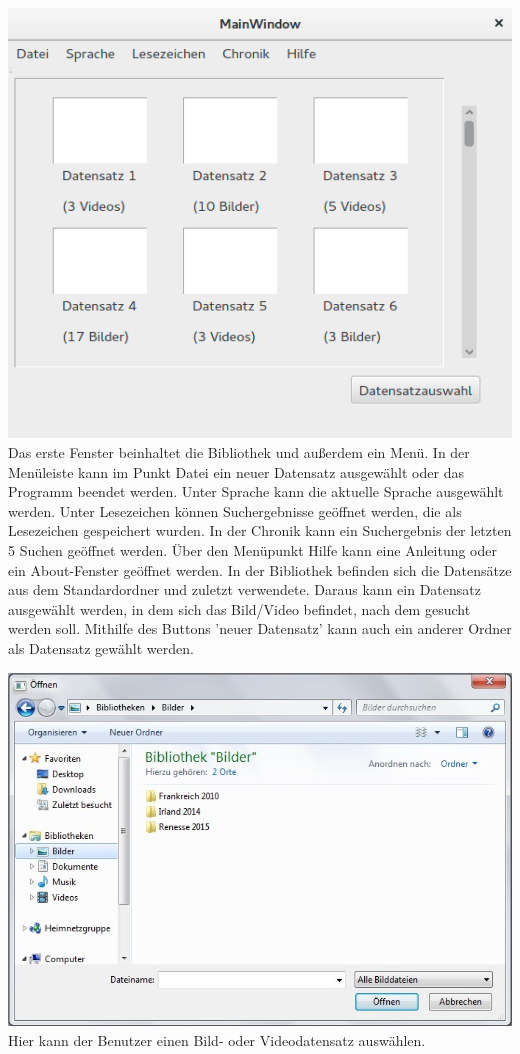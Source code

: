 \includegraphics[width=1\linewidth]{img/Bibliothek}
Das erste Fenster beinhaltet die Bibliothek und außerdem ein Menü. In der Menüleiste kann im Punkt Datei ein neuer Datensatz ausgewählt oder das Programm beendet werden.  Unter Sprache kann die aktuelle Sprache ausgewählt werden. Unter Lesezeichen können Suchergebnisse geöffnet werden, die als Lesezeichen gespeichert wurden. In der Chronik kann ein Suchergebnis der letzten 5 Suchen geöffnet werden. Über den Menüpunkt Hilfe kann eine Anleitung oder ein About-Fenster geöffnet werden.
In der Bibliothek befinden sich die Datensätze aus dem Standardordner und zuletzt verwendete. Daraus kann ein Datensatz ausgewählt werden, in dem sich das Bild/Video befindet, nach dem gesucht werden soll. Mithilfe des Buttons 'neuer Datensatz' kann auch ein anderer Ordner als Datensatz gewählt werden.

\includegraphics[width=1\linewidth]{img/FileChooser}
Hier kann der Benutzer einen Bild- oder Videodatensatz auswählen.

